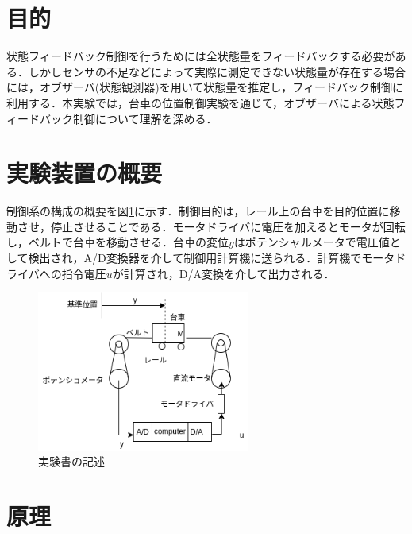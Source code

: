 \documentclass[12pt]{jsarticle}
\begin{document}
\section{目的}
状態フィードバック制御を行うためには全状態量をフィードバックする必要がある．しかしセンサの不足などによって実際に測定できない状態量が存在する場合には，オブザーバ(状態観測器)を用いて状態量を推定し，フィードバック制御に利用する．本実験では，台車の位置制御実験を通じて，オブザーバによる状態フィードバック制御について理解を深める．
\section{実験装置の概要}
制御系の構成の概要を図\ref{B2-1}に示す．制御目的は，レール上の台車を目的位置に移動させ，停止させることである．モータドライバに電圧を加えるとモータが回転し，ベルトで台車を移動させる．台車の変位$y$はポテンシャルメータで電圧値として検出され，A/D変換器を介して制御用計算機に送られる．計算機でモータドライバへの指令電圧$u$が計算され，D/A変換を介して出力される．
\begin{figure}[H]
  \begin{center}
    \includegraphics[clip,width=7.0cm]{../img/B2-1.png}
    \caption{実験書の記述}%
    \label{B2-1}
  \end{center}
\end{figure}
\section{原理}
\end{document}
